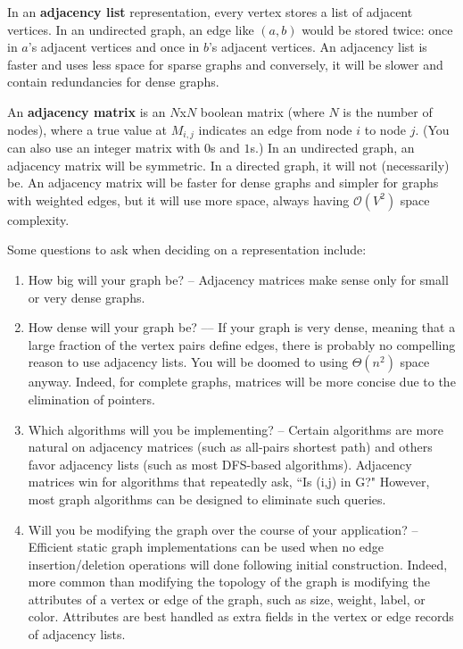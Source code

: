 \documentclass{article}
\newcommand{\bigO}{\mathcal{O}}
\begin{document}
    In an \textbf{adjacency list} representation, every vertex stores a list of adjacent vertices. In an undirected graph, an edge like $(a, b)$ would be stored twice: once in $a$'s adjacent vertices and once in $b$'s adjacent vertices. An adjacency list is faster and uses less space for sparse graphs and conversely, it will be slower and contain redundancies for dense graphs.
    
    An \textbf{adjacency matrix} is an $N$x$N$ boolean matrix (where $N$ is the number of nodes), where a true value at $M_{i,j}$ indicates an edge from node $i$ to node $j$. (You can also use an integer matrix with $0$s and $1$s.) In an undirected graph, an adjacency matrix will be symmetric. In a directed graph, it will not (necessarily) be. An adjacency matrix will be faster for dense graphs and simpler for graphs with weighted edges, but it will use more space, always having $\bigO(V^2)$ space complexity.
    
    Some questions to ask when deciding on a representation include:
    \begin{enumerate}
        \item How big will your graph be? – Adjacency matrices make sense only for small or very dense graphs.
        \item How dense will your graph be? –– If your graph is very dense, meaning that a large fraction of the vertex pairs define edges, there is probably no compelling reason to use adjacency lists. You will be doomed to using $\Theta(n^2)$ space anyway. Indeed, for complete graphs, matrices will be more concise due to the elimination of pointers.
        \item Which algorithms will you be implementing? – Certain algorithms are more natural on adjacency matrices (such as all-pairs shortest path) and others favor adjacency lists (such as most DFS-based algorithms). Adjacency matrices win for algorithms that repeatedly ask, ``Is (i,j) in G?" However, most graph algorithms can be designed to eliminate such queries.
        \item Will you be modifying the graph over the course of your application? – Efficient static graph implementations can be used when no edge insertion/deletion operations will done following initial construction. Indeed, more common than modifying the topology of the graph is modifying the attributes of a vertex or edge of the graph, such as size, weight, label, or color. Attributes are best handled as extra fields in the vertex or edge records of adjacency lists.
    \end{enumerate}
    
\end{document}
